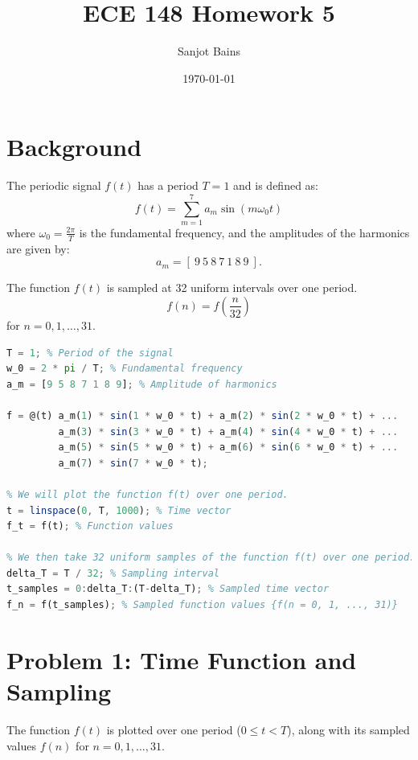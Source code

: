 \documentclass[12pt]{article}
\title{ECE 148 Homework 5}
\author{Sanjot Bains}
\date{\today}
\begin{document}
\maketitle

\section*{Background}
The periodic signal $f(t)$ has a period $T = 1$ and is defined as:
\[ f(t) = \sum_{m=1}^{7} a_m \sin(m \omega_0 t) \]
where $\omega_0 = \frac{2\pi}{T}$ is the fundamental frequency, and the amplitudes of the harmonics are given by:
\[ a_m = [ \ 9 \ 5 \ 8 \ 7 \ 1 \ 8 \ 9 \ ]. \]

The function $f(t)$ is sampled at 32 uniform intervals over one period.
\[ f(n) = f\left(\frac{n}{32}\right) \] for $n = 0, 1, \dots, 31$.

\vspace{1cm}
\begin{lstlisting}[language=Octave, caption=MATLAB Script to Initialize the Function]
T = 1; % Period of the signal
w_0 = 2 * pi / T; % Fundamental frequency
a_m = [9 5 8 7 1 8 9]; % Amplitude of harmonics

f = @(t) a_m(1) * sin(1 * w_0 * t) + a_m(2) * sin(2 * w_0 * t) + ...
         a_m(3) * sin(3 * w_0 * t) + a_m(4) * sin(4 * w_0 * t) + ...
         a_m(5) * sin(5 * w_0 * t) + a_m(6) * sin(6 * w_0 * t) + ...
         a_m(7) * sin(7 * w_0 * t);

% We will plot the function f(t) over one period.
t = linspace(0, T, 1000); % Time vector 
f_t = f(t); % Function values 

% We then take 32 uniform samples of the function f(t) over one period:
delta_T = T / 32; % Sampling interval
t_samples = 0:delta_T:(T-delta_T); % Sampled time vector
f_n = f(t_samples); % Sampled function values {f(n = 0, 1, ..., 31)}
\end{lstlisting}

\newpage
\section*{Problem 1: Time Function and Sampling}
The function $f(t)$ is plotted over one period ($0 \leq t < T$), along with its sampled values $f(n)$ for $n = 0, 1, \dots, 31$.
\end{document}
